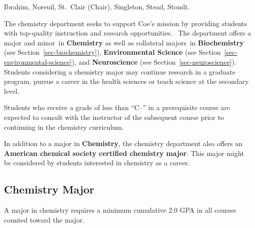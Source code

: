 \documentclass[
  letterpaper,
]{scrbook}
\begin{document}
Ibrahim, Noreuil, St.~Clair (Chair), Singleton, Stead, Stoudt.

The chemistry department seeks to support Coe's mission by providing
students with top-quality instruction and research opportunities.~ The
department offers a major and minor~in \textbf{Chemistry} as well as
collateral majors~in \textbf{Biochemistry} (see
Section~\ref{sec-biochemistry}), \textbf{Environmental Science} (see
Section~\ref{sec-environmental-science}), and \textbf{Neuroscience} (see
Section~\ref{sec-neuroscience}).~ Students considering a chemistry major
may continue research in a graduate program, pursue a career in the
health sciences or teach science at the secondary level.

Students who receive a grade of less than ``C--'' in a prerequisite
course are expected to consult with the instructor of the subsequent
course prior to continuing in the chemistry curriculum.

In addition to a major in \textbf{Chemistry}, the chemistry department
also offers an \textbf{American chemical society certified chemistry
major}. This major might be considered by students interested in
chemistry as a career.

\subsection{Chemistry Major}\label{chemistry-major}

A major in chemistry requires a minimum cumulative 2.0 GPA in all
courses counted toward the major.
\end{document}
